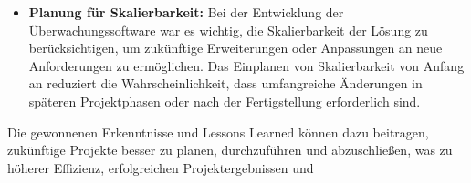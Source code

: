\begin{flushleft}
\begin{itemize}
	\item \textbf{Planung für Skalierbarkeit:} Bei der Entwicklung der Überwachungssoftware war es wichtig, die Skalierbarkeit der Lösung zu berücksichtigen, um zukünftige Erweiterungen oder Anpassungen an neue Anforderungen zu ermöglichen. Das Einplanen von Skalierbarkeit von Anfang an reduziert die Wahrscheinlichkeit, dass umfangreiche Änderungen in späteren Projektphasen oder nach der Fertigstellung erforderlich sind.


	\end{itemize}

	Die gewonnenen Erkenntnisse und Lessons Learned können dazu beitragen, zukünftige Projekte besser zu planen, durchzuführen und abzuschließen, was zu höherer Effizienz, erfolgreichen Projektergebnissen und



\end{flushleft}
